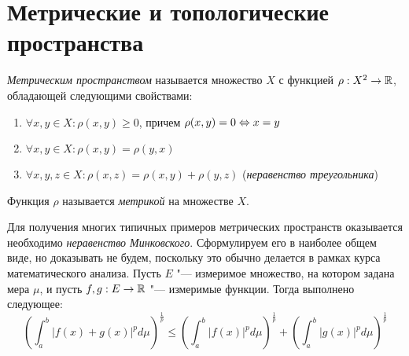 \section{Метрические и топологические пространства}

\begin{definition}
	\textit{Метрическим пространством} называется множество $X$ с функцией $\rho : X^2 \to \mathbb{R}$, обладающей следующими свойствами:
	\begin{enumerate}
		\item $\forall x, y \in X: \rho(x, y) \ge 0$, причем $\rho(x, y) = 0 \Leftrightarrow x = y$
		\item $\forall x, y \in X: \rho(x, y) = \rho(y, x)$
		\item $\forall x, y, z \in X: \rho(x, z) = \rho(x, y) + \rho(y, z)$ (\textit{неравенство треугольника})
	\end{enumerate}

	Функция $\rho$ называется \textit{метрикой} на множестве $X$.
\end{definition}

\begin{note}
	Для получения многих типичных примеров метрических пространств оказывается необходимо \textit{неравенство Минковского}. Сформулируем его в наиболее общем виде, но доказывать не будем, поскольку это обычно делается в рамках курса математического анализа. Пусть $E$ "--- измеримое множество, на котором задана мера $\mu$, и пусть $f, g: E \to \mathbb{R}$ "--- измеримые функции. Тогда выполнено следующее:
	\[\left(\int_a^b|f(x) + g(x)|^pd\mu\right)^{\frac 1p} \le \left(\int_a^b|f(x)|^pd\mu\right)^{\frac 1p} + \left(\int_a^b|g(x)|^pd\mu\right)^{\frac 1p}\]
\end{note}

